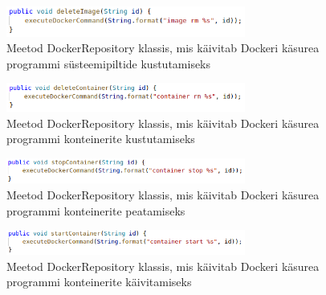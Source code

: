 \documentclass[12pt]{article}
\begin{document}
 \begin{figure} [ht] %
 \begin{center}
 \includegraphics[width=0.7\textwidth]{dockerdriver_repository_deleteimage}
 \caption{Meetod DockerRepository klassis, mis käivitab Dockeri käsurea programmi süsteemipiltide kustutamiseks}
 \label{fig:dockerdriver_repository_deleteimage}
 \end{center}
 \end{figure}
 \begin{figure} [ht] %
 \begin{center}
 \includegraphics[width=0.7\textwidth]{dockerdriver_repository_deletecontainer}
 \caption{Meetod DockerRepository klassis, mis käivitab Dockeri käsurea programmi konteinerite kustutamiseks}
 \label{fig:dockerdriver_repository_deletecontainer}
 \end{center}
 \end{figure}
 \begin{figure} [ht] %
 \begin{center}
 \includegraphics[width=0.7\textwidth]{dockerdriver_repository_stopcontainer}
 \caption{Meetod DockerRepository klassis, mis käivitab Dockeri käsurea programmi konteinerite peatamiseks}
 \label{fig:dockerdriver_repository_stopcontainer}
 \end{center}
 \end{figure}
 \begin{figure} [h] %
 \begin{center}
 \includegraphics[width=0.7\textwidth]{dockerdriver_repository_startcontainer}
 \caption{Meetod DockerRepository klassis, mis käivitab Dockeri käsurea programmi konteinerite käivitamiseks}
 \label{fig:dockerdriver_repository_startcontainer}
 \end{center}
 \end{figure}
\end{document}

